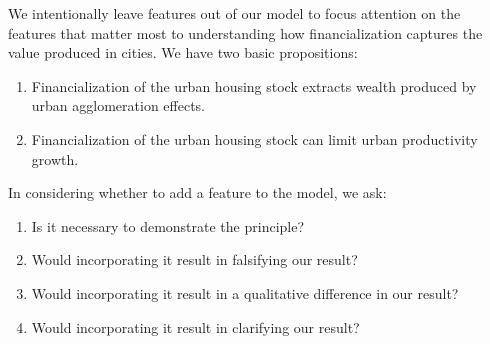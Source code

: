 We intentionally leave features out of our model to focus attention on the features that matter most to understanding how financialization captures the value produced in cities. We have two basic propositions:
\begin{enumerate}
    \item Financialization of the urban housing stock extracts wealth produced by urban agglomeration effects. 
    \item Financialization of the urban housing stock can limit urban productivity growth. 
\end{enumerate}
In considering whether to add a feature to the model, we ask: %
\begin{enumerate}
    \item Is it necessary to demonstrate the principle? 
    \item Would incorporating it result in falsifying our result?
    \item Would incorporating it result in a qualitative difference in our result?
    \item Would incorporating it result in clarifying our result?
\end{enumerate}

